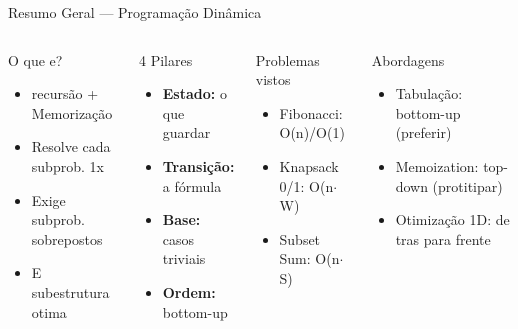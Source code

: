 \documentclass[aspectratio=169,10pt]{beamer}
\begin{document}
\begin{frame}[shrink=2]{Resumo Geral --- Programação Dinâmica}
  \begin{columns}[t]
      \begin{block}{O que e?}
        \begin{itemize}\footnotesize
          \item recursão + Memorização
          \item Resolve cada subprob. 1x
          \item Exige subprob. sobrepostos
          \item E subestrutura otima
        \end{itemize}
      \end{block}
      \vspace{0.08cm}
      \begin{block}{4 Pilares}
        \begin{itemize}\footnotesize
          \item \textbf{Estado:} o que guardar
          \item \textbf{Transição:} a fórmula
          \item \textbf{Base:} casos triviais
          \item \textbf{Ordem:} bottom-up
        \end{itemize}
      \end{block}
      \begin{block}{Problemas vistos}
        \begin{itemize}\footnotesize
          \item Fibonacci: O(n)/O(1)
          \item Knapsack 0/1: O(n$\cdot$W)
          \item Subset Sum: O(n$\cdot$S)
        \end{itemize}
      \end{block}
      \vspace{0.08cm}
      \begin{block}{Abordagens}
        \begin{itemize}\footnotesize
          \item Tabulação: bottom-up (preferir)
          \item Memoization: top-down (protitipar)
          \item Otimização 1D: de tras para frente
        \end{itemize}

\end{block}
\end{columns}
\end{frame}
\end{document}
